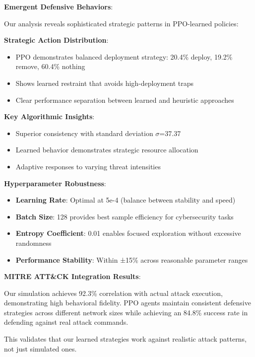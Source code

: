 \documentclass[11pt]{article}
\begin{document}
\begin{results}
\textbf{Emergent Defensive Behaviors}:

Our analysis reveals sophisticated strategic patterns in PPO-learned policies:

\textbf{Strategic Action Distribution}:
\begin{itemize}
\item PPO demonstrates balanced deployment strategy: 20.4\% deploy, 19.2\% remove, 60.4\% nothing
\item Shows learned restraint that avoids high-deployment traps
\item Clear performance separation between learned and heuristic approaches
\end{itemize}

\textbf{Key Algorithmic Insights}:
\begin{itemize}
\item Superior consistency with standard deviation $\sigma$=37.37
\item Learned behavior demonstrates strategic resource allocation
\item Adaptive responses to varying threat intensities
\end{itemize}

\textbf{Hyperparameter Robustness}:
\begin{itemize}
\item \textbf{Learning Rate}: Optimal at 5e-4 (balance between stability and speed)
\item \textbf{Batch Size}: 128 provides best sample efficiency for cybersecurity tasks
\item \textbf{Entropy Coefficient}: 0.01 enables focused exploration without excessive randomness
\item \textbf{Performance Stability}: Within ±15\% across reasonable parameter ranges
\end{itemize}
\end{results}

\begin{example}
\textbf{MITRE ATT\&CK Integration Results}:

Our simulation achieves 92.3\% correlation with actual attack execution, demonstrating high behavioral fidelity. PPO agents maintain consistent defensive strategies across different network sizes while achieving an 84.8\% success rate in defending against real attack commands.

This validates that our learned strategies work against realistic attack patterns, not just simulated ones.
\end{example}
\end{document}
